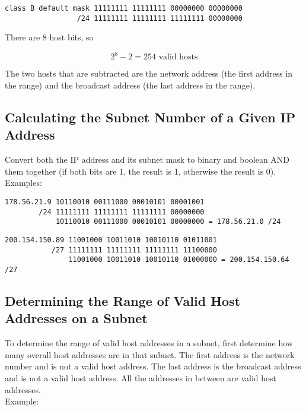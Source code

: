 \begin{verbatim}
class B default mask 11111111 11111111 00000000 00000000
                 /24 11111111 11111111 11111111 00000000
\end{verbatim}

There are 8 host bits, so

\begin{equation}
2 ^ 8 - 2 = 254 \mbox{ valid hosts}
\end{equation}

The two hosts that are subtracted are the network address (the first address in
the range) and the broadcast address (the last address in the range).

\subsection{Calculating the Subnet Number of a Given IP Address}

Convert both the IP address and its subnet mask to binary and boolean AND
them together (if both bits are 1, the result is 1, otherwise the result is
0).\\

Examples:

\begin{verbatim}
178.56.21.9 10110010 00111000 00010101 00001001
        /24 11111111 11111111 11111111 00000000
            10110010 00111000 00010101 00000000 = 178.56.21.0 /24
\end{verbatim}

\begin{verbatim}
200.154.150.89 11001000 10011010 10010110 01011001
           /27 11111111 11111111 11111111 11100000
               11001000 10011010 10010110 01000000 = 200.154.150.64 /27
\end{verbatim}

\subsection{Determining the Range of Valid Host Addresses on a Subnet}

To determine the range of valid host addresses in a subnet, first determine
how many overall host addresses are in that subnet. The first address is the
network number and is not a valid host address. The last address is the
broadcast address and is not a valid host address. All the addresses in
between are valid host addresses.\\

Example:

